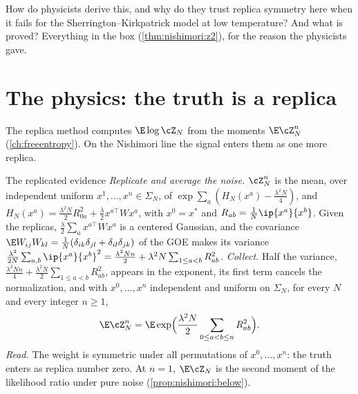 \begin{refsection}
How do physicists derive this, and why do they trust replica symmetry here when it fails for the Sherrington--Kirkpatrick model at low temperature? And what is proved? Everything in the box (\cref{thm:nishimori:z2}), for the reason the physicists gave.

\section{The physics: the truth is a replica}\label{sec:nishimori:physics}

The replica method computes $\E\log\cZ_N$ from the moments $\E\cZ_N^n$ (\cref{ch:freeentropy}). On the Nishimori line the signal enters them as one more replica.

\begin{computation}{The replicated evidence}\label{comp:nishimori:replicated}
\step \emph{Replicate and average the noise.} $\cZ_N^n$ is the mean, over independent uniform $x^1,\dots,x^n\in\Sigma_N$, of $\exp\sum_a(H_N(x^a)-\frac{\lambda^2N}4)$, and $H_N(x^a)=\frac{\lambda^2N}2R_{0a}^2+\frac\lambda2x^{a\top}Wx^a$, with $x^0=x^*$ and $R_{ab}=\frac1N\ip{x^a}{x^b}$. Given the replicas, $\frac\lambda2\sum_ax^{a\top}Wx^a$ is a centered Gaussian, and the covariance $\E W_{ij}W_{kl}=\frac1N(\delta_{ik}\delta_{jl}+\delta_{il}\delta_{jk})$ of the GOE makes its variance $\frac{\lambda^2}{2N}\sum_{a,b}\ip{x^a}{x^b}^2=\frac{\lambda^2Nn}2+\lambda^2N\sum_{1\le a<b}R_{ab}^2$.
\step \emph{Collect.} Half the variance, $\frac{\lambda^2Nn}4+\frac{\lambda^2N}2\sum_{1\le a<b}R_{ab}^2$, appears in the exponent, its first term cancels the normalization, and with $x^0,\dots,x^n$ independent and uniform on $\Sigma_N$, for every $N$ and every integer $n\ge1$,
\begin{equation}\label{eq:nishimori:replicated}
\E\cZ_N^n=\E\exp\Bigl(\frac{\lambda^2N}2\sum_{0\le a<b\le n}R_{ab}^2\Bigr).
\end{equation}
\step \emph{Read.} The weight is symmetric under all permutations of $x^0,\dots,x^n$: the truth enters as replica number zero. At $n=1$, $\E\cZ_N$ is the second moment of the likelihood ratio under pure noise (\cref{prop:nishimori:below}).
\end{computation}


\end{refsection}
